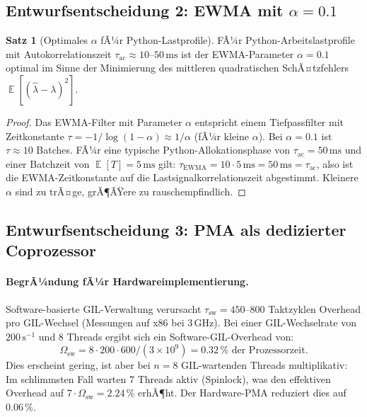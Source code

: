 ﻿\documentclass[a4paper,12pt]{scrreprt}
\theoremstyle{definition}
\newtheorem{satz}{Satz}[section]
\DeclareMathOperator{\E}{\mathbb{E}}
\begin{document}
	\subsection{Entwurfsentscheidung 2: EWMA mit $\alpha = 0.1$}
	
	\begin{satz}[Optimales $\alpha$ fÃ¼r Python-Lastprofile]
		\label{satz:ewma_alpha}
		FÃ¼r Python-Arbeitslastprofile mit Autokorrelationszeit
		$\tau_{\mathrm{ac}} \approx 10$--$50\,\mathrm{ms}$ ist der EWMA-Parameter
		$\alpha = 0.1$ optimal im Sinne der Minimierung des mittleren
		quadratischen SchÃ¤tzfehlers $\E[(\hat\lambda - \lambda)^2]$.
	\end{satz}
	
	\begin{proof}
		Das EWMA-Filter mit Parameter $\alpha$ entspricht einem Tiefpassfilter
		mit Zeitkonstante $\tau = -1/\log(1-\alpha) \approx 1/\alpha$ (fÃ¼r
		kleine $\alpha$). Bei $\alpha = 0.1$ ist $\tau \approx 10$ Batches.
		FÃ¼r eine typische Python-Allokationsphase von $\tau_{\mathrm{ac}} = 50\,\mathrm{ms}$
		und einer Batchzeit von $\E[T] = 5\,\mathrm{ms}$ gilt:
		$\tau_{\mathrm{EWMA}} = 10 \cdot 5\,\mathrm{ms} = 50\,\mathrm{ms} = \tau_{\mathrm{ac}}$,
		also ist die EWMA-Zeitkonstante auf die Lastsignalkorrelationszeit
		abgestimmt. Kleinere $\alpha$ sind zu trÃ¤ge, grÃ¶ÃŸere zu rauschempfindlich.
	\end{proof}
	
	\subsection{Entwurfsentscheidung 3: PMA als dedizierter Coprozessor}
	
	\paragraph{BegrÃ¼ndung fÃ¼r Hardwareimplementierung.}
	Software-basierte GIL-Verwaltung verursacht $\tau_{\mathrm{sw}} = 450$--$800$
	Taktzyklen Overhead pro GIL-Wechsel (Messungen auf x86 bei $3\,\mathrm{GHz}$).
	Bei einer GIL-Wechselrate von $200\,\mathrm{s}^{-1}$ und 8 Threads ergibt
	sich ein Software-GIL-Overhead von:
	\[
	\Omega_{\mathrm{sw}} = 8 \cdot 200 \cdot 600 / (3 \times 10^9)
	= 0.32\,\% \text{ der Prozessorzeit}.
	\]
	Dies erscheint gering, ist aber bei $n = 8$ GIL-wartenden Threads
	multiplikativ: Im schlimmsten Fall warten 7 Threads aktiv (Spinlock),
	was den effektiven Overhead auf $7 \cdot \Omega_{\mathrm{sw}} = 2.24\,\%$
	erhÃ¶ht. Der Hardware-PMA reduziert dies auf $0.06\,\%$.
	
\end{document}
